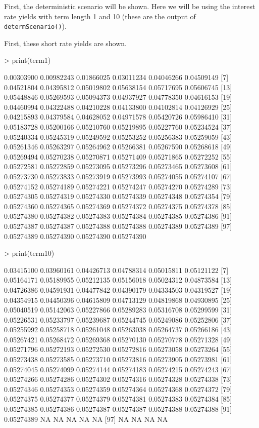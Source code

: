 \documentclass[12pt]{article}
\begin{document}
First, the deterministic scenario will be shown. Here we will be using 
the interest rate yields with term length 1 and 10 (these are the output
of \texttt{determScenario()}). 

\medskip
First, these short rate yields are shown.
\begin{Schunk}
\begin{Sinput}
> print(term1)
\end{Sinput}
\begin{Soutput}
  [1] 0.00303900 0.00982243 0.01866025 0.03011234 0.04046266 0.04509149
  [7] 0.04521804 0.04395812 0.05019802 0.05638154 0.05717695 0.05606745
 [13] 0.05448846 0.05269593 0.05094373 0.04937927 0.04778350 0.04616153
 [19] 0.04460994 0.04322488 0.04210228 0.04133800 0.04102814 0.04126929
 [25] 0.04215893 0.04379584 0.04628052 0.04971578 0.05420726 0.05986410
 [31] 0.05183728 0.05200166 0.05210760 0.05219895 0.05227760 0.05234524
 [37] 0.05240334 0.05245319 0.05249592 0.05253252 0.05256383 0.05259059
 [43] 0.05261346 0.05263297 0.05264962 0.05266381 0.05267590 0.05268618
 [49] 0.05269494 0.05270238 0.05270871 0.05271409 0.05271865 0.05272252
 [55] 0.05272581 0.05272859 0.05273095 0.05273296 0.05273465 0.05273608
 [61] 0.05273730 0.05273833 0.05273919 0.05273993 0.05274055 0.05274107
 [67] 0.05274152 0.05274189 0.05274221 0.05274247 0.05274270 0.05274289
 [73] 0.05274305 0.05274319 0.05274330 0.05274339 0.05274348 0.05274354
 [79] 0.05274360 0.05274365 0.05274369 0.05274372 0.05274375 0.05274378
 [85] 0.05274380 0.05274382 0.05274383 0.05274384 0.05274385 0.05274386
 [91] 0.05274387 0.05274387 0.05274388 0.05274388 0.05274389 0.05274389
 [97] 0.05274389 0.05274390 0.05274390 0.05274390
\end{Soutput}
\begin{Sinput}
> print(term10)
\end{Sinput}
\begin{Soutput}
  [1] 0.03415100 0.03960161 0.04426713 0.04788314 0.05015811 0.05121122
  [7] 0.05164171 0.05189955 0.05212135 0.05156018 0.05024312 0.04873584
 [13] 0.04726386 0.04591931 0.04477842 0.04390179 0.04334503 0.04319527
 [19] 0.04354915 0.04450396 0.04615809 0.04713129 0.04819868 0.04930895
 [25] 0.05040519 0.05142063 0.05227866 0.05289283 0.05316708 0.05299599
 [31] 0.05226531 0.05233797 0.05239687 0.05244745 0.05249086 0.05252806
 [37] 0.05255992 0.05258718 0.05261048 0.05263038 0.05264737 0.05266186
 [43] 0.05267421 0.05268472 0.05269368 0.05270130 0.05270778 0.05271328
 [49] 0.05271796 0.05272193 0.05272530 0.05272816 0.05273058 0.05273264
 [55] 0.05273438 0.05273585 0.05273710 0.05273816 0.05273905 0.05273981
 [61] 0.05274045 0.05274099 0.05274144 0.05274183 0.05274215 0.05274243
 [67] 0.05274266 0.05274286 0.05274302 0.05274316 0.05274328 0.05274338
 [73] 0.05274346 0.05274353 0.05274359 0.05274364 0.05274368 0.05274372
 [79] 0.05274375 0.05274377 0.05274379 0.05274381 0.05274383 0.05274384
 [85] 0.05274385 0.05274386 0.05274387 0.05274387 0.05274388 0.05274388
 [91] 0.05274389         NA         NA         NA         NA         NA
 [97]         NA         NA         NA         NA
\end{Soutput}
\end{Schunk}
\end{document}
